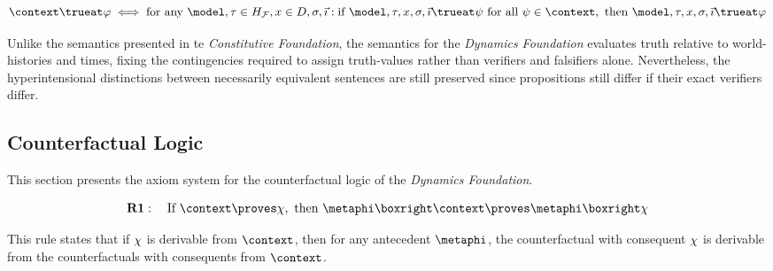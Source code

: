 \documentclass[../LogosReference.tex]{subfiles}
\begin{document}

\begin{definition}\label{def:consequence-core}
	\[
		\context \trueat \metaA \iff \text{for any } \model, \tau \in \historyspace, x \in D, \assignment, \tempindex: \text{if } \model, \tau, x, \assignment, \tempindex \trueat \metaB \text{ for all } \metaB \in \context, \text{ then } \model, \tau, x, \assignment, \tempindex \trueat \metaA
	\]
\end{definition}

\begin{remark}
	Unlike the semantics presented in te \textit{Constitutive Foundation}, the semantics for the \textit{Dynamics Foundation} evaluates truth relative to world-histories and times, fixing the contingencies required to assign truth-values rather than verifiers and falsifiers alone.
	Nevertheless, the hyperintensional distinctions between necessarily equivalent sentences are still preserved since propositions still differ if their exact verifiers differ.
\end{remark}



\subsection{Counterfactual Logic}\label{sec:counterfactual-axioms}

This section presents the axiom system for the counterfactual logic of the \textit{Dynamics Foundation}.


\begin{definition}\label{def:closure-deduction}
	\[
		\textbf{R1}: \quad \text{If } \context \proves \metaC, \text{ then } \metaphi \boxright \context \proves \metaphi \boxright \metaC
	\]
\end{definition}

\begin{remark}
	This rule states that if $\chi$ is derivable from $\context$, then for any antecedent $\metaphi$, the counterfactual with consequent $\chi$ is derivable from the counterfactuals with consequents from $\context$.
\end{remark}
\end{document}

